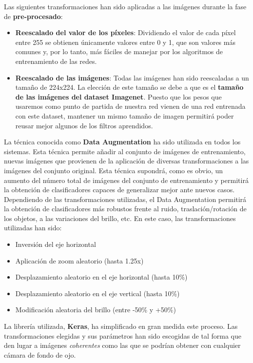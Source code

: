 \documentclass[
  12pt,
  spanish,
  a4paperpaper,
]{report}
\providecommand{\tightlist}{%
  \setlength{\itemsep}{0pt}\setlength{\parskip}{0pt}}
\begin{document}
Las siguientes transformaciones han sido aplicadas a las imágenes
durante la fase de \textbf{pre-procesado}:

\begin{itemize}
\tightlist
\item
  \textbf{Reescalado del valor de los píxeles}: Dividiendo el valor de
  cada píxel entre 255 se obtienen únicamente valores entre 0 y 1, que
  son valores más comunes y, por lo tanto, más fáciles de manejar por
  los algoritmos de entrenamiento de las redes.
\item
  \textbf{Reescalado de las imágenes}: Todas las imágenes han sido
  reescaladas a un tamaño de 224x224. La elección de este tamaño se debe
  a que es el \textbf{tamaño de las imágenes del dataset Imagenet}.
  Puesto que los pesos que usaremos como punto de partida de nuestra red
  vienen de una red entrenada con este dataset, mantener un mismo tamaño
  de imagen permitirá poder reusar mejor algunos de los filtros
  aprendidos.
\end{itemize}

La técnica conocida como \textbf{Data Augmentation} ha sido utilizada en
todos los sistemas. Esta técnica permite añadir al conjunto de imágenes
de entrenamiento, nuevas imágenes que provienen de la aplicación de
diversas transformaciones a las imágenes del conjunto original. Esta
técnica supondrá, como es obvio, un aumento del número total de imágenes
del conjunto de entrenamiento y permitirá la obtención de clasificadores
capaces de generalizar mejor ante nuevos casos. Dependiendo de las
transformaciones utilizadas, el Data Augmentation permitirá la obtención
de clasificadores más robustos frente al ruido, traslación/rotación de
los objetos, a las variaciones del brillo, etc. En este caso, las
transformaciones utilizadas han sido:

\begin{itemize}
\tightlist
\item
  Inversión del eje horizontal
\item
  Aplicación de zoom aleatorio (hasta 1.25x)
\item
  Desplazamiento aleatorio en el eje horizontal (hasta 10\%)
\item
  Desplazamiento aleatorio en el eje vertical (hasta 10\%)
\item
  Modificación aleatoria del brillo (entre -50\% y +50\%)
\end{itemize}

La librería utilizada, \textbf{Keras}, ha simplificado en gran medida
este proceso. Las transformaciones elegidas y sus parámetros han sido
escogidas de tal forma que den lugar a imágenes \emph{coherentes} como
las que se podrían obtener con cualquier cámara de fondo de ojo.
\end{document}
